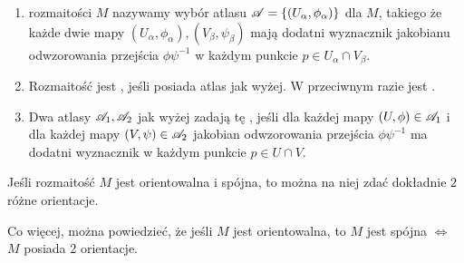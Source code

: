 \begin{definition}$ $
  \begin{enumerate}
    \item {} rozmaitości $M$ nazywamy wybór atlasu $\mathcal{A}=\{(U_\alpha,\phi_\alpha)\}$ dla $M$, takiego że każde dwie mapy $(U_\alpha,\phi_\alpha),(V_\beta,\psi_\beta)$ mają dodatni wyznacznik jakobianu odwzorowania przejścia $\phi\psi^{-1}$ w każdym punkcie $p\in U_\alpha\cap V_\beta$.
    \item Rozmaitość jest , jeśli posiada atlas jak wyżej. W przeciwnym razie jest .
    \item Dwa atlasy $\mathcal{A}_1,\mathcal{A}_2$ jak wyżej zadają tę , jeśli dla każdej mapy $(U,\phi)\in \mathcal{A}_1$ i dla każdej mapy $(V,\psi)\in\mathcal{A}_2$ jakobian odwzorowania przejścia $\phi\psi^{-1}$ ma dodatni wyznacznik w każdym punkcie $p\in U\cap V$.
  \end{enumerate}
\end{definition}

\begin{remark}
  Jeśli rozmaitość $M$ jest orientowalna i spójna, to można na niej zdać dokładnie $2$ różne orientacje. 

  Co więcej, można powiedzieć, że jeśli $M$ jest orientowalna, to $M$ jest spójna $\iff$ $M$ posiada 2 orientacje.
\end{remark}

